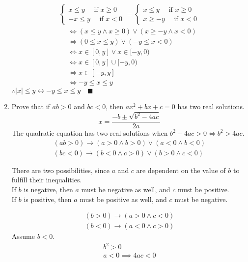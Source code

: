 \documentclass[letterpaper, 12pt]{article}
\newcommand{\qed}{\quad \blacksquare}
\newcommand{\then}{\rightarrow}
\begin{document}
\begin{enumerate}
\begin{gather*}
\begin{cases}
        x \le y \quad \text{ if } x \ge 0 \\
        -x \le y \quad \text{ if } x < 0
    \end{cases} = \begin{cases}
        x \le y \quad \text{ if } x \ge 0 \\
        x \ge -y \quad \text{ if } x < 0
    \end{cases}
\end{gather*}
\begin{align*}
    &\iff (x \le y \wedge x \ge 0) \vee (x \ge -y \wedge x < 0) \\
    &\iff (0 \le x \le y) \vee (-y \le x < 0) \\
    &\iff x \in [0, y] \vee x \in [-y, 0) \\
    &\iff x \in [0, y] \cup [-y, 0) \\
    &\iff x \in [-y, y] \\
    &\iff -y \le x \le y
\end{align*}
$\therefore |x| \le y \leftrightarrow -y \le x \le y \qed$
\pagebreak
\item Prove that if $ab > 0$ and $bc < 0$, then $ax^2 + bx + c = 0$ has two real solutions. \\
\[x = \frac{-b \pm \sqrt{b^2 - 4ac}}{2a}\]
The quadratic equation has two real solutions when $b^2 - 4ac > 0 \iff b^2 > 4ac$.
\begin{gather*}
    (ab > 0) \then (a > 0 \wedge b > 0) \vee (a < 0 \wedge b < 0) \\
    (bc < 0) \then (b < 0 \wedge c > 0) \vee (b > 0 \wedge c < 0)
\end{gather*}
\begin{flushleft}
    There are two possibilities, since $a$ and $c$ are dependent on the value of $b$ to fulfill 
    their inequalities. \\
    If $b$ is negative, then $a$ must be negative as well, and $c$ must be positive. \\
    If $b$ is positive, then $a$ must be positive as well, and $c$ must be negative.
\end{flushleft}
\begin{gather*}
    (b > 0) \then (a > 0 \wedge c < 0) \\
    (b < 0) \then (a < 0 \wedge c > 0)
\end{gather*}
Assume $b < 0$.
\begin{gather*}
    b^2 > 0 \\
    a < 0 \implies 4ac < 0 \\

\end{gather*}
\end{enumerate}
\end{document}
